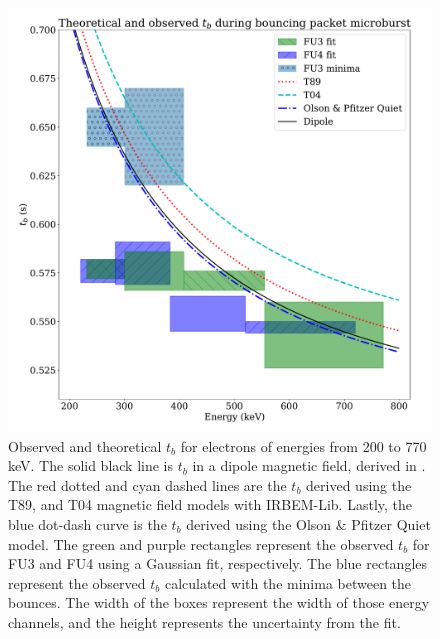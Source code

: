 \documentclass[draft, linenumbers]{agujournal}
\begin{document}
\begin{figure}
\includegraphics[width=\textwidth]{detrended_bounce_period_boxed_adj.pdf}
\caption{Observed and theoretical $t_b$ for electrons of energies from 200 to 770 keV. The solid black line is $t_b$ in a dipole magnetic field, derived in \citet{Schulz1974}. The red dotted and cyan dashed lines are the $t_b$ derived using the T89, and T04 magnetic field models with IRBEM-Lib. Lastly, the blue dot-dash curve is the $t_b$ derived using the Olson \& Pfitzer Quiet model. The green and purple rectangles represent the observed $t_b$ for FU3 and FU4 using a Gaussian fit, respectively. The blue rectangles represent the observed $t_b$ calculated with the minima between the bounces. The width of the boxes represent the width of those energy channels, and the height represents the uncertainty from the fit.}
\label{tb_plot}
\end{figure}
\end{document}
